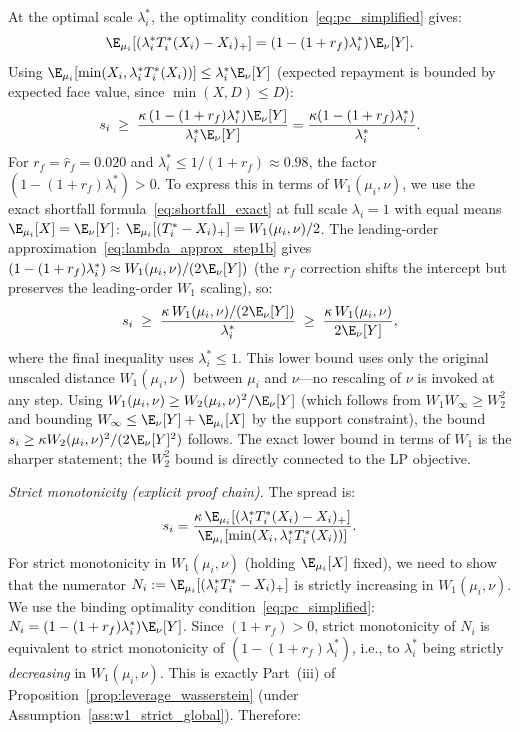 At the optimal scale $\lambda_i^*$, the optimality condition~\eqref{eq:pc_simplified} gives:
\[
  \E_{\mu_i}[(\lambda_i^* T_i^*(X_i)-X_i)_+] = (1-(1+r_f)\lambda_i^*)\E_\nu[Y].
\]
Using $\E_{\mu_i}[\min(X_i,\lambda_i^* T_i^*(X_i))] \leq \lambda_i^* \E_\nu[Y]$ (expected repayment is bounded by expected face value, since $\min(X,D) \leq D$):
\[
  s_i \;\geq\; \frac{\kappa\,(1-(1+r_f)\lambda_i^*)\E_\nu[Y]}{\lambda_i^*\E_\nu[Y]} = \frac{\kappa(1-(1+r_f)\lambda_i^*)}{\lambda_i^*}.
\]
For $r_f = \hat{r}_f = 0.020$ and $\lambda_i^* \leq 1/(1+r_f) \approx 0.98$, the factor $(1-(1+r_f)\lambda_i^*) > 0$. To express this in terms of $W_1(\mu_i,\nu)$, we use the exact shortfall formula~\eqref{eq:shortfall_exact} at full scale $\lambda_i = 1$ with equal means $\E_{\mu_i}[X]=\E_\nu[Y]$: $\E_{\mu_i}[(T_i^*-X_i)_+] = W_1(\mu_i,\nu)/2$. The leading-order approximation~\eqref{eq:lambda_approx_step1b} gives $(1-(1+r_f)\lambda_i^*) \approx W_1(\mu_i,\nu)/(2\E_\nu[Y])$ (the $r_f$ correction shifts the intercept but preserves the leading-order $W_1$ scaling), so:
\[
  s_i \;\geq\; \frac{\kappa\,W_1(\mu_i,\nu)/(2\E_\nu[Y])}{\lambda_i^*} \;\geq\; \frac{\kappa\,W_1(\mu_i,\nu)}{2\E_\nu[Y]},
\]
where the final inequality uses $\lambda_i^* \leq 1$. This lower bound uses only the original unscaled distance $W_1(\mu_i,\nu)$ between $\mu_i$ and $\nu$---no rescaling of $\nu$ is invoked at any step. Using $W_1(\mu_i,\nu) \geq W_2(\mu_i,\nu)^2/\E_\nu[Y]$ (which follows from $W_1 W_\infty \geq W_2^2$ and bounding $W_\infty \leq \E_\nu[Y] + \E_{\mu_i}[X]$ by the support constraint), the bound $s_i \geq \kappa W_2(\mu_i,\nu)^2 / (2\E_\nu[Y]^2)$ follows. The exact lower bound in terms of $W_1$ is the sharper statement; the $W_2^2$ bound is directly connected to the LP objective.

\emph{Strict monotonicity (explicit proof chain).} The spread is:
\[
  s_i = \frac{\kappa\,\E_{\mu_i}[(\lambda_i^* T_i^*(X_i)-X_i)_+]}{\E_{\mu_i}[\min(X_i, \lambda_i^* T_i^*(X_i))]}.
\]
For strict monotonicity in $W_1(\mu_i,\nu)$ (holding $\E_{\mu_i}[X]$ fixed), we need to show that the numerator $N_i := \E_{\mu_i}[(\lambda_i^* T_i^*-X_i)_+]$ is strictly increasing in $W_1(\mu_i,\nu)$. We use the binding optimality condition~\eqref{eq:pc_simplified}: $N_i = (1-(1+r_f)\lambda_i^*)\E_\nu[Y]$. Since $(1+r_f) > 0$, strict monotonicity of $N_i$ is equivalent to strict monotonicity of $(1-(1+r_f)\lambda_i^*)$, i.e., to $\lambda_i^*$ being strictly \emph{decreasing} in $W_1(\mu_i,\nu)$. This is exactly Part~(iii) of Proposition~\ref{prop:leverage_wasserstein} (under Assumption~\ref{ass:w1_strict_global}). Therefore:

